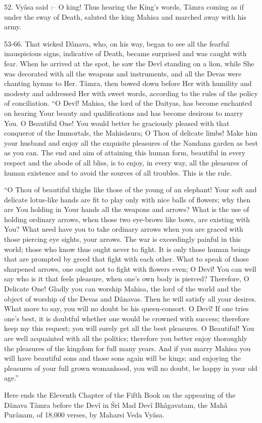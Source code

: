 52. Vy\^asa said :-- O king! Thus hearing the King's words, T\^amra coming as if under the sway of Death, saluted the king Mahisa and marched away with his army.

53-66. That wicked D\^anava, who, on his way, began to see all the fearful inauspicious signs, indicative of Death, became surprised and was caught with fear. When he arrived at the spot, he saw the Dev\^i standing on a lion, while She was decorated with all the weapons and instruments, and all the Devas were chanting hymns to Her. T\^amra, then bowed down before Her with humility and modesty and addressed Her with sweet words, according to the rules of the policy of conciliation. ``O Dev\^i! Mahisa, the lord of the Daityas, has become enchanted on hearing Your beauty and qualifications and has become desirous to marry You. O Beautiful One! You would better be graciously pleased with that conqueror of the Immortals, the Mahis\^asura; O Thou of delicate limbs! Make him your husband and enjoy all the exquisite pleasures of the Nandana garden as best as you can. The end and aim of attaining this human form, beautiful in every respect and the abode of all bliss, is to enjoy, in every way, all the pleasures of human existence and to avoid the sources of all troubles. This is the rule.

``O Thou of beautiful thighs like those of the young of an elephant! Your soft and delicate lotus-like hands are fit to play only with nice balls of flowers; why then are You holding in Your hands all the weapons and arrows? What is the use of holding ordinary arrows, when those two eye-brows like bows, are existing with You? What need have you to take ordinary arrows when you are graced with those piercing eye sights, your arrows. The war is exceedingly painful in this world; those who know thus ought never to fight. It is only those human beings that are prompted by greed that fight with each other. What to speak of those sharpened arrows, one ought not to fight with flowers even; O Dev\^i! You can well say who is it that feels pleasure, when one's own body is pierced? Therefore, O Delicate One! Gladly you can worship Mahisa, the lord of the world and the object of worship of the Devas and D\^anavas. Then he will satisfy all your desires. What more to say, you will no doubt be his queen-consort. O Dev\^i! If one tries one's best, it is doubtful whether one would be crowned with success; therefore keep my this request; you will surely get all the best pleasures. O Beautiful! You are well acquainted with all the politics; therefore you better enjoy thoroughly the pleasures of the kingdom for full many years. And if you marry Mahisa you will have beautiful sons and those sons again will be kings; and enjoying the pleasures of your full grown womanhood, you will no doubt, be happy in your old age.''

Here ends the Eleventh Chapter of the Fifth Book on the appearing of the D\^anava T\^amra before the Dev\^i in \'Sr\^i Mad Dev\^i Bh\^agavatam, the Mah\^a Pur\^anam, of 18,000 verses, by Maharsi Veda Vy\^asa.